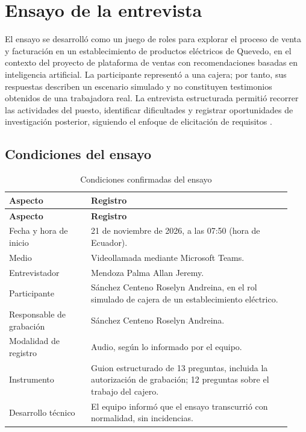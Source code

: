 \section{Ensayo de la entrevista}
\label{sec:ensayo-entrevista}

El ensayo se desarrolló como un juego de roles para explorar el proceso de venta y facturación en un establecimiento de productos eléctricos de Quevedo, en el contexto del proyecto de plataforma de ventas con recomendaciones basadas en inteligencia artificial. La participante representó a una cajera; por tanto, sus respuestas describen un escenario simulado y no constituyen testimonios obtenidos de una trabajadora real. La entrevista estructurada permitió recorrer las actividades del puesto, identificar dificultades y registrar oportunidades de investigación posterior, siguiendo el enfoque de elicitación de requisitos \cite{pohl2025,ireb2026}.

\subsection{Condiciones del ensayo}

\begingroup
\small
\renewcommand{\arraystretch}{1.15}
\begin{longtable}{@{}p{0.27\linewidth}p{0.66\linewidth}@{}}
\caption{Condiciones confirmadas del ensayo}\label{tab:ensayo-condiciones}\\
\toprule
\textbf{Aspecto} & \textbf{Registro} \\
\midrule
\endfirsthead
\toprule
\textbf{Aspecto} & \textbf{Registro} \\
\midrule
\endhead
\bottomrule
\endlastfoot
Fecha y hora de inicio & 21 de noviembre de 2026, a las 07:50 (hora de Ecuador). \\
Medio & Videollamada mediante Microsoft Teams. \\
Entrevistador & Mendoza Palma Allan Jeremy. \\
Participante & Sánchez Centeno Roselyn Andreina, en el rol simulado de cajera de un establecimiento eléctrico. \\
Responsable de grabación & Sánchez Centeno Roselyn Andreina. \\
Modalidad de registro & Audio, según lo informado por el equipo. \\
Instrumento & Guion estructurado de 13 preguntas, incluida la autorización de grabación; 12 preguntas sobre el trabajo del cajero. \\
Desarrollo técnico & El equipo informó que el ensayo transcurrió con normalidad, sin incidencias. \\
\end{longtable}
\endgroup

